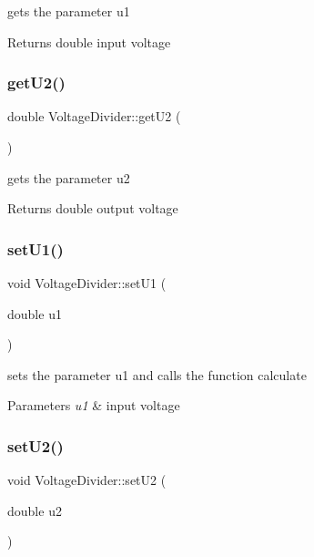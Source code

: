 gets the parameter u1 

\begin{DoxyReturn}{Returns}
double input voltage 
\end{DoxyReturn}
\mbox{\label{classVoltageDivider_aee0957fabf473c72488e3d5fa7316bcd}} 
\subsubsection{\texorpdfstring{get\+U2()}{getU2()}}
{\footnotesize\ttfamily double Voltage\+Divider\+::get\+U2 (\begin{DoxyParamCaption}{ }\end{DoxyParamCaption})}



gets the parameter u2 

\begin{DoxyReturn}{Returns}
double output voltage 
\end{DoxyReturn}
\mbox{\label{classVoltageDivider_aecff4be4ac8dbe9dbee07f57a15cc370}} 
\subsubsection{\texorpdfstring{set\+U1()}{setU1()}}
{\footnotesize\ttfamily void Voltage\+Divider\+::set\+U1 (\begin{DoxyParamCaption}\item[{double}]{u1 }\end{DoxyParamCaption})}



sets the parameter u1 and calls the function calculate 


\begin{DoxyParams}{Parameters}
{\em u1} & input voltage \\
\hline
\end{DoxyParams}
\mbox{\label{classVoltageDivider_a52270fd71980ed94bc64e7a6f65a9e5c}} 
\subsubsection{\texorpdfstring{set\+U2()}{setU2()}}
{\footnotesize\ttfamily void Voltage\+Divider\+::set\+U2 (\begin{DoxyParamCaption}\item[{double}]{u2 }\end{DoxyParamCaption})}



